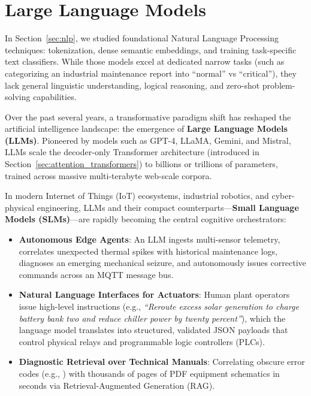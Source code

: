 \section{Large Language Models}\label{sec:llms}

In Section~\ref{sec:nlp}, we studied foundational Natural Language Processing techniques: tokenization, dense semantic embeddings, and training task-specific text classifiers. While those models excel at dedicated narrow tasks (such as categorizing an industrial maintenance report into ``normal'' vs ``critical''), they lack general linguistic understanding, logical reasoning, and zero-shot problem-solving capabilities.

Over the past several years, a transformative paradigm shift has reshaped the artificial intelligence landscape: the emergence of \textbf{Large Language Models (LLMs)}. Pioneered by models such as GPT-4, LLaMA, Gemini, and Mistral, LLMs scale the decoder-only Transformer architecture (introduced in Section~\ref{sec:attention_transformers}) to billions or trillions of parameters, trained across massive multi-terabyte web-scale corpora.

In modern Internet of Things (IoT) ecosystems, industrial robotics, and cyber-physical engineering, LLMs and their compact counterparts---\textbf{Small Language Models (SLMs)}---are rapidly becoming the central cognitive orchestrators:
\begin{itemize}
    \item \textbf{Autonomous Edge Agents}: An LLM ingests multi-sensor telemetry, correlates unexpected thermal spikes with historical maintenance logs, diagnoses an emerging mechanical seizure, and autonomously issues corrective commands across an MQTT message bus.
    \item \textbf{Natural Language Interfaces for Actuators}: Human plant operators issue high-level instructions (e.g., \emph{``Reroute excess solar generation to charge battery bank two and reduce chiller power by twenty percent''}), which the language model translates into structured, validated JSON payloads that control physical relays and programmable logic controllers (PLCs).
    \item \textbf{Diagnostic Retrieval over Technical Manuals}: Correlating obscure error codes (e.g., ) with thousands of pages of PDF equipment schematics in seconds via Retrieval-Augmented Generation (RAG).
\end{itemize}

